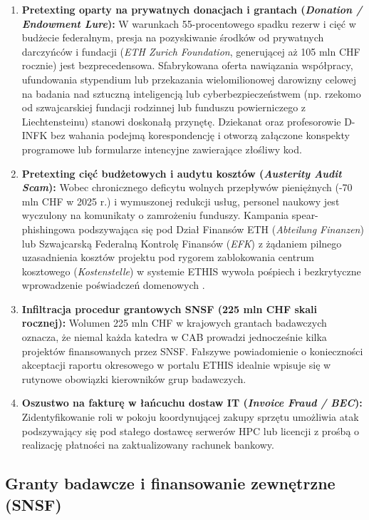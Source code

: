\begin{enumerate}
    \item \textbf{Pretexting oparty na prywatnych donacjach i grantach (\textit{Donation / Endowment Lure}):} W warunkach 55-procentowego spadku rezerw i cięć w budżecie federalnym, presja na pozyskiwanie środków od prywatnych darczyńców i fundacji (\textit{ETH Zurich Foundation}, generującej aż 105 mln CHF rocznie) jest bezprecedensowa. Sfabrykowana oferta nawiązania współpracy, ufundowania stypendium lub przekazania wielomilionowej darowizny celowej na badania nad sztuczną inteligencją lub cyberbezpieczeństwem (np. rzekomo od szwajcarskiej fundacji rodzinnej lub funduszu powierniczego z Liechtensteinu) stanowi doskonałą przynętę. Dziekanat oraz profesorowie D-INFK bez wahania podejmą korespondencję i otworzą załączone konspekty programowe lub formularze intencyjne zawierające złośliwy kod.
    \item \textbf{Pretexting cięć budżetowych i audytu kosztów (\textit{Austerity Audit Scam}):} Wobec chronicznego deficytu wolnych przepływów pieniężnych (-70 mln CHF w 2025 r.) i wymuszonej redukcji usług, personel naukowy jest wyczulony na komunikaty o zamrożeniu funduszy. Kampania spear-phishingowa podszywająca się pod Dział Finansów ETH (\textit{Abteilung Finanzen}) lub Szwajcarską Federalną Kontrolę Finansów (\textit{EFK}) z żądaniem pilnego uzasadnienia kosztów projektu pod rygorem zablokowania centrum kosztowego (\textit{Kostenstelle}) w systemie ETHIS wywoła pośpiech i bezkrytyczne wprowadzenie poświadczeń domenowych .
    \item \textbf{Infiltracja procedur grantowych SNSF (225 mln CHF skali rocznej):} Wolumen 225 mln CHF w krajowych grantach badawczych oznacza, że niemal każda katedra w CAB prowadzi jednocześnie kilka projektów finansowanych przez SNSF. Fałszywe powiadomienie o konieczności akceptacji raportu okresowego w portalu ETHIS idealnie wpisuje się w rutynowe obowiązki kierowników grup badawczych.
    \item \textbf{Oszustwo na fakturę w łańcuchu dostaw IT (\textit{Invoice Fraud / BEC}):} Zidentyfikowanie roli  w pokoju  koordynującej zakupy sprzętu umożliwia atak podszywający się pod stałego dostawcę serwerów HPC lub licencji z prośbą o realizację płatności na zaktualizowany rachunek bankowy.
\end{enumerate}

\subsection{Granty badawcze i finansowanie zewnętrzne (SNSF)}\label{subsec:granty-badawcze}

